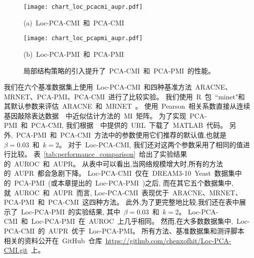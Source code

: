 \begin{figure*}[!htbp]
  \centering
  \begin{minipage}[b]{0.45\linewidth}
    \centering
    \centerline{
      \texttt{[image: chart\_loc\_pcacmi\_aupr.pdf]}}
    \centerline{(a)~Loc-PCA-CMI~和~PCA-CMI}
    \medskip  
  \end{minipage}
  \begin{minipage}[b]{0.45\linewidth}
    \centering
    \centerline{
      \texttt{[image: chart\_loc\_pcapmi\_aupr.pdf]}}
    \centerline{(b)~Loc-PCA-PMI~和~PCA-PMI}
    \medskip  
  \end{minipage}
    
  \caption{
    局部结构策略的引入提升了~PCA-CMI~和~PCA-PMI~的性能。
  }
  \label{fig:loc}
\end{figure*}

我们在六个基准数据集上使用~Loc-PCA-CMI~和四种基准方法~ARACNE、MRNET、PCA-PMI、PCA-CMI~进行了比较实验。
我们使用~R~包~``minet"和其默认参数来评估~ARACNE~和~MRNET~\cite{meyer2008minet}。
使用~Pearson~相关系数直接从连续基因敲除表达数据~\cite{olsen2008impact,meyer2010information}~中近似估计方法的~MI~矩阵。
为了实现~PCA-PMI~和~PCA-CMI, 我们根据~\cite{zhang2011inferring,zhao2016part}~中提供的~URL~下载了~MATLAB~代码。
另外,~PCA-PMI~和~PCA-CMI~方法中的参数使用它们推荐的默认值,也就是~$\beta = 0.03$~和~$k = 2$。
对于~Loc-PCA-CMI, 我们还对这两个参数采用了相同的值进行比较。
表~\ref{tab:performance_comparison}~给出了实验结果的~AUROC~和~AUPR。
从表中可以看出,当网络规模增大时,所有的方法的~AUPR~都会急剧下降。
Loc-PCA-CMI~仅在~DREAM3-10~Yeast~数据集中的~PCA-PMI~(或本章提出的~Loc-PCA-PMI~)之后,
而在其它五个数据集中,就~AUROC~和~AUPR~而言,
Loc-PCA-CMI~表现优于~ARACNE、MRNET、PCA-PMI~和~PCA-CMI~这四种方法。
此外,为了更完整地比较,我们还在表中展示了~Loc-PCA-PMI~的实验结果,
其中~$\beta = 0.03$~和~$k = 2$。
Loc-PCA-CMI~和~Loc-PCA-PMI~在~AUROC~上几乎相同。
然而,在大多数数据集中,~Loc-PCA-CMI~的~AUPR~优于~Loc-PCA-PMI。
所有方法、基准数据集和测评脚本相关的资料公开在~GitHub~仓库~\url{https://github.com/chenxofhit/Loc-PCA-CMI.git}~上。

